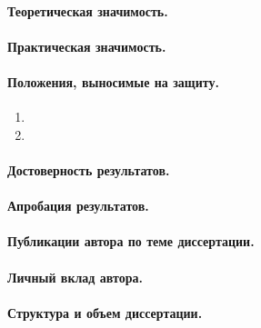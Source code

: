 \paragraph*{Теоретическая значимость.}

\paragraph*{Практическая значимость.}

\paragraph*{Положения, выносимые на защиту.}
\begin{enumerate}
    \item \statementOneRU
    \item \statementTwoRU
\end{enumerate}

\paragraph*{Достоверность результатов.}

\paragraph*{Апробация результатов.}

\paragraph*{Публикации автора по теме диссертации.}

\paragraph*{Личный вклад автора.}

\paragraph*{Структура и объем диссертации.}
